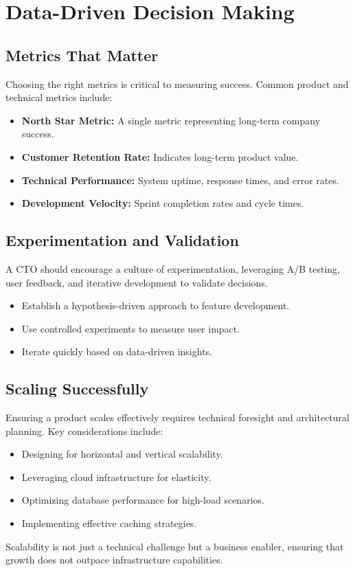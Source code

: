 \section{Data-Driven Decision Making}

\subsection{Metrics That Matter}
Choosing the right metrics is critical to measuring success. Common product and technical metrics include:

\begin{itemize}
    \item \textbf{North Star Metric:} A single metric representing long-term company success.
    \item \textbf{Customer Retention Rate:} Indicates long-term product value.
    \item \textbf{Technical Performance:} System uptime, response times, and error rates.
    \item \textbf{Development Velocity:} Sprint completion rates and cycle times.
\end{itemize}

\subsection{Experimentation and Validation}
A CTO should encourage a culture of experimentation, leveraging A/B testing, user feedback, and iterative development to validate decisions.

\begin{itemize}
    \item Establish a hypothesis-driven approach to feature development.
    \item Use controlled experiments to measure user impact.
    \item Iterate quickly based on data-driven insights.
\end{itemize}

\subsection{Scaling Successfully}
Ensuring a product scales effectively requires technical foresight and architectural planning. Key considerations include:

\begin{itemize}
    \item Designing for horizontal and vertical scalability.
    \item Leveraging cloud infrastructure for elasticity.
    \item Optimizing database performance for high-load scenarios.
    \item Implementing effective caching strategies.
\end{itemize}

Scalability is not just a technical challenge but a business enabler, ensuring that growth does not outpace infrastructure capabilities.
